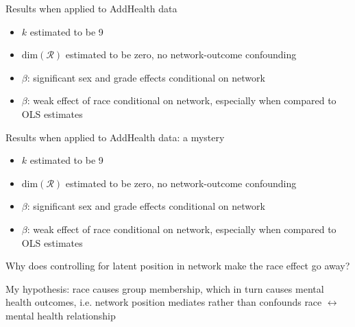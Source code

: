 \documentclass{beamer}
\theoremstyle{remark}
\begin{document}
\begin{frame}{Results when applied to AddHealth data}

    \begin{itemize}
        \item $k$ estimated to be 9
        \item $\mathrm{dim}(\mathcal R)$ estimated to be zero, no network-outcome confounding
        \item $\beta$: significant sex and grade effects conditional on network
        \item $\beta$: weak effect of race conditional on network, especially when compared to OLS estimates
    \end{itemize}

\end{frame}

\begin{frame}{Results when applied to AddHealth data: a mystery}

    \begin{itemize}
        \item $k$ estimated to be 9
        \item $\mathrm{dim}(\mathcal R)$ estimated to be zero, no network-outcome confounding
        \item $\beta$: significant sex and grade effects conditional on network
        \item $\beta$: weak effect of race conditional on network, especially when compared to OLS estimates
    \end{itemize}

    Why does controlling for latent position in network make the race effect go away?

    My hypothesis: race causes group membership, which in turn causes mental health outcomes, i.e. network position mediates rather than confounds race $\leftrightarrow$ mental health relationship

\end{frame}
\end{document}
